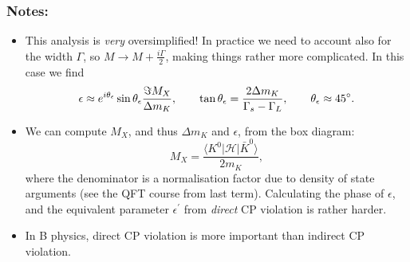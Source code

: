 \subsubsection{Notes:}
\begin{itemize}
\item This analysis is \textit{very} oversimplified! In practice we need to account also for the width $\Gamma$, so $M\to M + \frac{i\Gamma}{2}$, making things rather more complicated. In this case we find
\begin{equation}
\epsilon \approx e^{i\theta_\epsilon}\sin\theta_\epsilon \frac{\Im M_X}{\Delta m_K}, \qquad \tan\theta_\epsilon = \frac{2\Delta m_K}{\Gamma_s - \Gamma_L}, \qquad \theta_\epsilon \approx 45 \degree.
\end{equation}
\item We can compute $M_X$, and thus $\Delta m_K$ and $\epsilon$, from the box diagram:
\begin{equation}
M_X = \frac{\langle K^0 | \mathcal{H} | \bar{K}^0 \rangle}{2m_K},
\end{equation}
where the denominator is a normalisation factor due to density of state arguments (see the QFT course from last term). Calculating the phase of $\epsilon$, and the equivalent parameter $\epsilon^\prime$ from \textit{direct} CP violation is rather harder.
\item In B physics, direct CP violation is more important than indirect CP violation.
\end{itemize}
%
